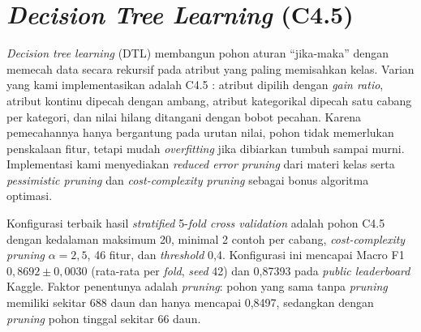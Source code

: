 \section{\textit{Decision Tree Learning} (C4.5)}
\label{sec:dtl}

\textit{Decision tree learning} (DTL) membangun pohon aturan ``jika-maka'' dengan memecah data secara
rekursif pada atribut yang paling memisahkan kelas. Varian yang kami implementasikan adalah C4.5
\cite{quinlan1993c45}: atribut dipilih dengan \textit{gain ratio}, atribut kontinu dipecah dengan
ambang, atribut kategorikal dipecah satu cabang per kategori, dan nilai hilang ditangani dengan bobot
pecahan. Karena pemecahannya hanya bergantung pada urutan nilai, pohon tidak memerlukan penskalaan
fitur, tetapi mudah \textit{overfitting} jika dibiarkan tumbuh sampai murni. Implementasi kami
menyediakan \textit{reduced error pruning} dari materi kelas \cite{slide-dtl-issues} serta
\textit{pessimistic pruning} \cite{quinlan1993c45} dan \textit{cost-complexity pruning}
\cite{breiman1984cart} sebagai bonus algoritma optimasi.

Konfigurasi terbaik hasil \textit{stratified} 5-\textit{fold cross validation} adalah pohon C4.5
dengan kedalaman maksimum 20, minimal 2 contoh per cabang, \textit{cost-complexity pruning}
$\alpha = 2{,}5$, 46 fitur, dan \textit{threshold} 0,4. Konfigurasi ini mencapai Macro F1
$0{,}8692 \pm 0{,}0030$ (rata-rata per \textit{fold}, \textit{seed} 42) dan 0,87393 pada
\textit{public leaderboard} Kaggle. Faktor penentunya adalah \textit{pruning}: pohon yang sama tanpa
\textit{pruning} memiliki sekitar 688 daun dan hanya mencapai 0,8497, sedangkan dengan
\textit{pruning} pohon tinggal sekitar 66 daun.






